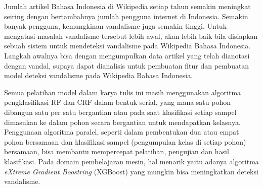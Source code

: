 Jumlah artikel Bahasa Indonesia di Wikipedia setiap tahun semakin meningkat
seiring dengan bertambahnya jumlah pengguna internet di Indonesia.
Semakin banyak pengguna, kemungkinan vandalisme juga semakin tinggi.
Untuk mengatasi masalah vandalisme tersebut lebih awal, akan lebih baik bila
disiapkan sebuah sistem untuk mendeteksi vandalisme pada Wikipedia
Bahasa Indonesia.
Langkah awalnya bisa dengan mengumpulkan data artikel yang telah dianotasi
dengan vandal, supaya dapat dianalisis untuk pembuatan fitur dan pembuatan
model deteksi vandalisme pada Wikipedia Bahasa Indonesia.

Semua pelatihan model dalam karya tulis ini masih menggunakan algoritma
pengklasifikasi RF dan CRF dalam bentuk serial, yang mana satu pohon dibangun
satu per satu bergantian atau pada saat klasifikasi setiap sampel dimasukan ke
dalam pohon secara bergantian untuk mendapatkan kelasnya.
Penggunaan algoritma paralel, seperti dalam pembentukan dua atau empat pohon
bersamaan dan klasifikasi sampel (pengumpulan kelas di setiap pohon)
bersamaan, bisa membantu mempercepat pelatihan, pengujian dan hasil
klasifikasi.
Pada domain pembelajaran mesin, hal menarik yaitu adanya algoritma
\textit{eXtreme Gradient Boostring} (XGBoost)
\parencite{chen2016xgboost}
yang
mungkin bisa meningkatkan deteksi vandalisme.

